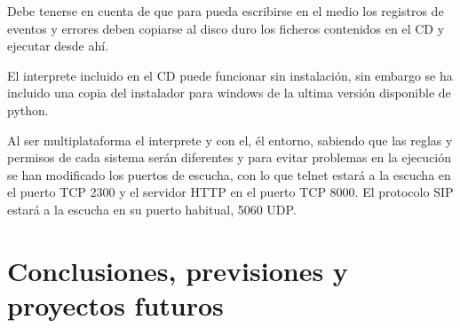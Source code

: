 \documentclass[a4paper,spanish,12pt]{book}
\begin{document}
Debe tenerse en cuenta de que para pueda escribirse en el medio los registros de eventos y errores deben copiarse al disco duro los ficheros contenidos en el CD y ejecutar desde ahí. 

El interprete incluido en el CD puede funcionar sin instalación, sin embargo se ha incluido una copia del instalador para windows de la ultima versión disponible de python.

Al ser multiplataforma el interprete y con el, \'el entorno, sabiendo que las reglas y permisos de cada sistema serán diferentes y para evitar problemas en la ejecución se han modificado los puertos de escucha, con lo que telnet estará a la escucha en el puerto TCP 2300 y el servidor HTTP en el puerto TCP 8000. El protocolo SIP estará a la escucha en su puerto habitual, 5060 UDP.


\chapter{Conclusiones, previsiones y proyectos futuros}
\end{document}

